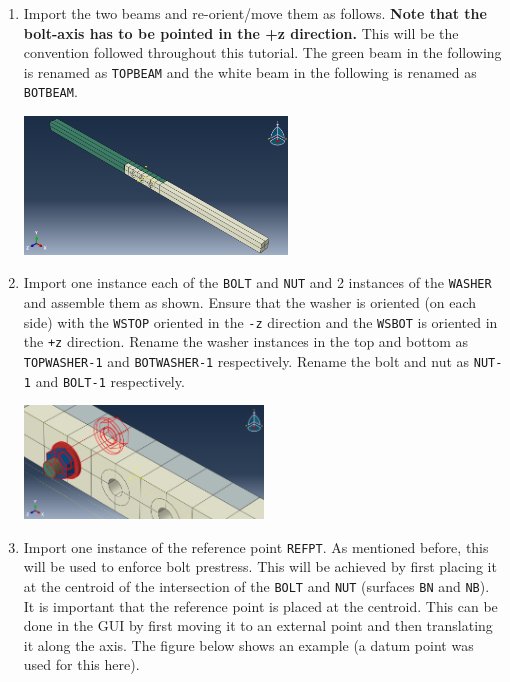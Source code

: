 \documentclass[11pt]{article}
\begin{document}
\begin{enumerate}
\item Import the two beams and re-orient/move them as follows.
\textbf{Note that the bolt-axis has to be pointed in the +z direction.}
This will be the convention followed throughout this tutorial.
The green beam in the following is renamed as \texttt{TOPBEAM} and the white beam in the following is renamed as \texttt{BOTBEAM}.
\begin{center}
\includegraphics[width=0.55\textwidth]{./figs/asb1.png}
\end{center}
\item Import one instance each of the \texttt{BOLT} and \texttt{NUT} and 2 instances of the \texttt{WASHER} and assemble them as shown.
Ensure that the washer is oriented (on each side) with the \texttt{WSTOP} oriented in the \texttt{-z} direction and the \texttt{WSBOT} is oriented in the \texttt{+z} direction.
Rename the washer instances in the top and bottom as \texttt{TOPWASHER-1} and \texttt{BOTWASHER-1} respectively.
Rename the bolt and nut as \texttt{NUT-1} and \texttt{BOLT-1} respectively.
\begin{center}
\includegraphics[width=0.5\textwidth]{./figs/asbwn.png}
\end{center}
\item Import one instance of the reference point \texttt{REFPT}.
As mentioned before, this will be used to enforce bolt prestress.
This will be achieved by first placing it at the centroid of the intersection of the \texttt{BOLT} and \texttt{NUT} (surfaces \texttt{BN} and \texttt{NB}).
It is important that the reference point is placed at the centroid.
This can be done in the GUI by first moving it to an external point and then translating it along the axis.
The figure below shows an example (a datum point was used for this here).

\end{enumerate}
\end{document}

